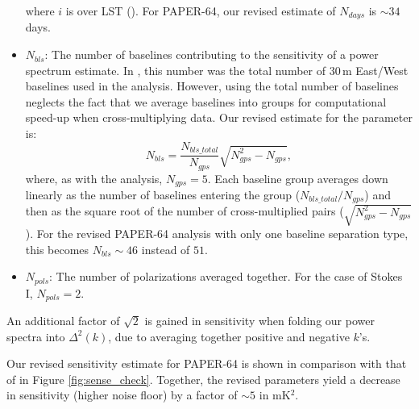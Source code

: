 \documentclass[preprint2,numberedappendix,tighten]{aastex6}  %
\begin{document}
\begin{itemize}
\begin{equation}
 \end{equation}
\noindent where $i$ is over LST (\citealt{jacobs_et_al2015}). For PAPER-64, our revised estimate of $N_{days}$ is $\sim34$ 
days.
\item $N_{bls}$: The number of baselines contributing to the sensitivity of a power spectrum estimate. In , this number was 
the total number of $30$\,m East/West baselines used in the analysis. However, using the total number of baselines neglects 
the fact that we average baselines into groups for computational speed-up when cross-multiplying data. Our revised estimate for the parameter is:
\begin{equation}
N_{bls} = \frac{N_{bls\_total}}{N_{gps}}\sqrt{N_{gps}^{2}-N_{gps}},
\end{equation}
\noindent where, as with the  analysis, $N_{gps} = 5$. Each baseline group averages down linearly as the number of baselines 
entering the group ($N_{bls\_total}/N_{gps}$) and then as the square root of the number of cross-multiplied pairs ($\sqrt{N_{gps}^{2} - 
N_{gps}}$). For the revised PAPER-64 analysis with only one baseline separation type, this becomes $N_{bls} \sim 46$ instead 
of $51$. 
\item $N_{pols}$: The number of polarizations averaged together. For the case of Stokes I, $N_{pols}=2$.
\end{itemize}

An additional factor of $\sqrt{2}$ is gained in sensitivity when folding our power spectra into $\Delta^{2}(k)$, due to averaging 
together positive and negative $k$'s. 

Our revised sensitivity estimate for PAPER-64 is shown in comparison with that of  in Figure \ref{fig:sense_check}. 
Together, the revised parameters yield a decrease in sensitivity (higher noise floor) by a factor of $\sim5$ in mK$^{2}$. 
\end{document}
